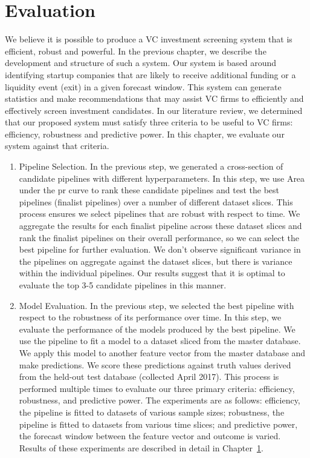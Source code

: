 \documentclass[../thesis/thesis.tex]{subfiles}
\begin{document}
\chapter{Evaluation}
\label{chap:evaluation}

We believe it is possible to produce a VC investment screening system that is efficient, robust and powerful. In the previous chapter, we describe the development and structure of such a system. Our system is based around identifying startup companies that are likely to receive additional funding or a liquidity event (exit) in a given forecast window. This system can generate statistics and make recommendations that may assist VC firms to efficiently and effectively screen investment candidates. In our literature review, we determined that our proposed system must satisfy three criteria to be useful to VC firms: efficiency, robustness and predictive power. In this chapter, we evaluate our system against that criteria.

\begin{enumerate}

\item Pipeline Selection. In the previous step, we generated a cross-section of candidate pipelines with different hyperparameters. In this step, we use Area under the \gls{pr} curve to rank these candidate pipelines and test the best pipelines (finalist pipelines) over a number of different dataset slices. This process ensures we select pipelines that are robust with respect to time. We aggregate the results for each finalist pipeline across these dataset slices and rank the finalist pipelines on their overall performance, so we can select the best pipeline for further evaluation. We don't observe significant variance in the pipelines on aggregate against the dataset slices, but there is variance within the individual pipelines. Our results suggest that it is optimal to evaluate the top 3-5 candidate pipelines in this manner.

\item Model Evaluation. In the previous step, we selected the best pipeline with respect to the robustness of its performance over time. In this step, we evaluate the performance of the models produced by the best pipeline. We use the pipeline to fit a model to a dataset sliced from the master database. We apply this model to another feature vector from the master database and make predictions. We score these predictions against truth values derived from the held-out test database (collected April 2017). This process is performed multiple times to evaluate our three primary criteria: efficiency, robustness, and predictive power. The experiments are as follows: efficiency, the pipeline is fitted to datasets of various sample sizes; robustness, the pipeline is fitted to datasets from various time slices; and predictive power, the forecast window between the feature vector and outcome is varied. Results of these experiments are described in detail in Chapter~\ref{chap:evaluation}.

\end{enumerate}
\end{document}
